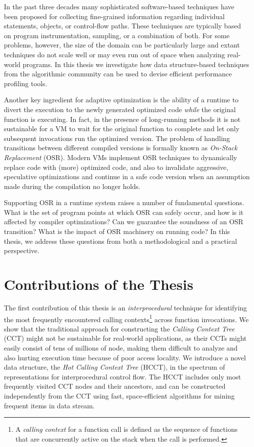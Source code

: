 In the past three decades many sophisticated software-based techniques have been proposed for collecting fine-grained information regarding individual statements, objects, or control-flow paths. These techniques are typically based on program instrumentation, sampling, or a combination of both. For some problems, however, the size of the domain can be particularly large and extant techniques do not scale well or may even run out of space when analyzing real-world programs. In this thesis we investigate how data structure-based techniques from the algorithmic community can be used to devise efficient performance profiling tools. %


Another key ingredient for adaptive optimization is the ability of a runtime to divert the execution to the newly generated optimized code {\em while} the original function is executing. In fact, in the presence of long-running methods it is not sustainable for a VM to wait for the original function to complete and let only subsequent invocations run the optimized version. The problem of handling transitions between different compiled versions is formally known as {\em On-Stack Replacement} (OSR). Modern VMs implement OSR techniques to dynamically replace code with (more) optimized code, and also to invalidate aggressive, speculative optimizations and continue in a safe code version when an assumption made during the compilation no longer holds.

Supporting OSR in a runtime system raises a number of fundamental questions. What is the set of program points at which OSR can safely occur, and how is it affected by compiler optimizations? Can we guarantee the soundness of an OSR transition? What is the impact of OSR machinery on running code? In this thesis, we address these questions from both a methodological and a practical perspective.

\section{Contributions of the Thesis}

The first contribution of this thesis is an {\em interprocedural} technique for identifying the most frequently encountered calling contexts\footnote{A {\em calling context} for a function call is defined as the sequence of functions that are concurrently active on the stack when the call is performed.} across function invocations. We show that the traditional approach for constructing the {\em Calling Context Tree} (CCT) might  not be sustainable for real-world applications, as their CCTs might easily consist of tens of millions of node, making them difficult to analyze and also hurting execution time because of poor access locality. We introduce a novel data structure, the {\em Hot Calling Context Tree} (HCCT), in the spectrum of representations for interprocedural control flow. The HCCT includes only most frequently visited CCT nodes and their ancestors, and can be constructed independently from the CCT using fast, space-efficient algorithms for mining frequent items in data stream.


